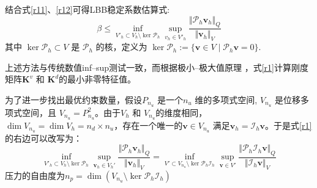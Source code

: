 结合式\eqref{r11}、\eqref{r12}可得LBB稳定系数估算式:
\begin{equation}\label{r1}
    \beta \le \inf_{V'_h \subset V_h \setminus \ker \mathcal P_h} \sup_{v_h \in V'_h} \frac{\Vert \mathcal P_h \boldsymbol v_h \Vert_Q}{\Vert \boldsymbol v_h \Vert_V}
\end{equation}
其中 $\ker \mathcal P_h \subset V$ 是 $\mathcal P_h$ 的核，定义为 $\ker \mathcal P_h := \{ \boldsymbol v \in V \;\vert\; \mathcal P_h \boldsymbol v = 0 \}$.

上述方法与传统数值inf--sup测试一致\cite{malkus1981}，而根据极小--极大值原理 \cite{babuska1991a}，式\eqref{r1}计算刚度矩阵$\boldsymbol K^v$ 和 $\boldsymbol K^d$的最小非零特征值。

为了进一步找出最优约束数量，假设$P_{n_u}$ 是一个$n_u$ 维的多项式空间, $V_{n_u}$ 是位移多项式空间，且 $V_{n_u} = P_{n_u}^2$。由于$V_h$ 和 $V_{n_u}$的维度相同，$\dim V_{n_u}=\dim V_h = n_d\times n_u$，存在一个唯一的$\boldsymbol v \in V_{n_u}$ 满足$\boldsymbol v_h = \mathcal I_h \boldsymbol v$。于是式\eqref{r1}的右边可以改写为：
\begin{equation}\label{r21}
    \inf_{V'_h \subset V_h\setminus \ker \mathcal P_h}\sup_{\boldsymbol v_h \in V_h'} \frac{\Vert \mathcal P_h \boldsymbol v_h \Vert_Q}{\Vert \boldsymbol v_h \Vert_V} = 
    \inf_{V'\subset V_{n_u}\setminus \ker \mathcal P_h \mathcal I_h}\sup_{\boldsymbol v \in V'} \frac{\Vert \mathcal P_h \mathcal I_h \boldsymbol v \Vert_Q}{\Vert \mathcal I_h \boldsymbol v \Vert_V}
\end{equation}
压力的自由度为$n_p = \dim(V_{n_u}\setminus \ker \mathcal P_h \mathcal I_h)$

